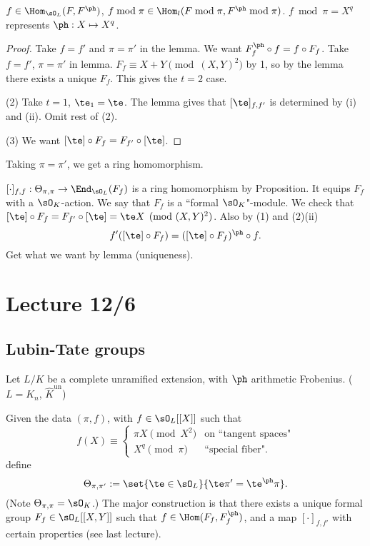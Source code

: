 $f\in \Hom_{\sO_L}(F,F^{\ph})$, $f\bmod{\pi}\in \Hom_l(F\bmod{\pi},F^{\ph}\bmod{\pi})$. $f\bmod{\pi}=X^q$ represents $\ph:X\mapsto X^q$.
\begin{proof}
Take $f=f'$ and $\pi=\pi'$ in the lemma. We want $F_f^{\ph}\circ f=f\circ F_f$. Take $f=f'$, $\pi=\pi'$ in lemma. $F_f\equiv X+Y\pmod{(X,Y)^2}$ by 1, so by the lemma there exists a unique $F_f$. This gives the $t=2$ case.

(2) Take $t=1$, $\te_1=\te$. The lemma gives that $[\te]_{f,f'}$ is determined by (i) and (ii). Omit rest of (2).

(3) We want $[\te]\circ F_f=F_{f'}\circ [\te]$. 
\end{proof}
Taking $\pi=\pi'$, we get a ring homomorphism.
\begin{cor}
$[\cdot]_{f,f}:\Theta_{\pi,\pi}\to \End_{\sO_L}(F_f)$ is a ring homomorphism by Proposition. It equips $F_f$ with a $\sO_K$-action. We say that $F_f$ is a ``formal $\sO_K$"-module. We check that $[\te]\circ F_f=F_{f'}\circ [\te]=\te X\pmod{(X,Y)^2}$. Also by (1) %
and (2)(ii)
\[
f'([\te]\circ F_f)=([\te]\circ F_f)^{\ph}\circ f.
\]
Get what we want by lemma (uniqueness).
\end{cor}
\section{Lecture 12/6}
\subsection{Lubin-Tate groups}
Let $L/K$ be a complete unramified extension, with $\ph$ arithmetic Frobenius. ($L=K_n$, $\hat{K}^{\text{un}}$) 

Given the data $(\pi, f)$, with $f\in \sO_L[[X]]$ such that
\[
f(X)\equiv \begin{cases}
\pi X \pmod{X^2}&\text{on ``tangent spaces"}\\
X^q \pmod{\pi}&\text{``special fiber".} 
\end{cases}
\]
define
\[
\Theta_{\pi,\pi'}:=\set{\te\in \sO_L}{\te \pi'=\te^{\ph} \pi}.
\]
(Note $\Theta_{\pi,\pi}=\sO_K$.) %
The major construction is that there exists a unique formal group $F_{f}\in \sO_L[[X,Y]]$ such that $f\in \Hom(F_f,F_f^{\ph})$, and a map $[\cdot]_{f,f'}$ with certain properties (see last lecture).
